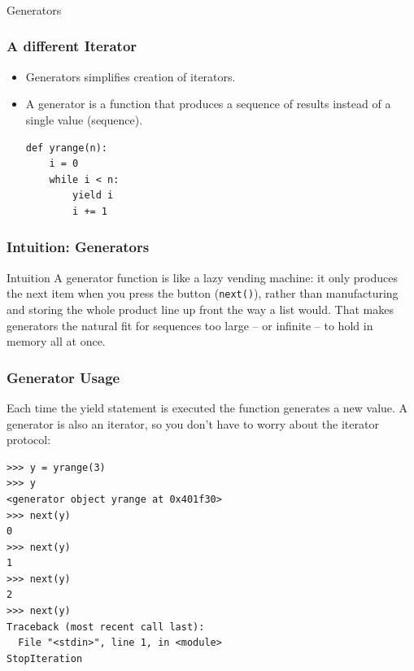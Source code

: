 \begin{frame}[fragile]\frametitle{}
\begin{center}
{\Large Generators}
\end{center}
\end{frame}


\begin{frame}[fragile]\frametitle{A different Iterator}

    \begin{itemize}
    \item  Generators simplifies creation of iterators. 
    \item A generator is a function that produces a sequence of results instead of a single value (sequence).
\begin{lstlisting}
def yrange(n):
    i = 0
    while i < n:
        yield i
        i += 1
\end{lstlisting}
    \end{itemize}
\end{frame}

\begin{frame}[fragile]\frametitle{Intuition: Generators}
\begin{block}{Intuition}
A generator function is like a lazy vending machine: it only produces the next item when you
press the button (\lstinline|next()|), rather than manufacturing and storing the whole product
line up front the way a list would. That makes generators the natural fit for sequences too
large -- or infinite -- to hold in memory all at once.
\end{block}
\end{frame}

\begin{frame}[fragile]\frametitle{Generator Usage}
Each time the yield statement is executed the function generates a new value. A generator is
also an iterator, so you don't have to worry about the iterator protocol:
\begin{lstlisting}
>>> y = yrange(3)
>>> y
<generator object yrange at 0x401f30>
>>> next(y)
0
>>> next(y)
1
>>> next(y)
2
>>> next(y)
Traceback (most recent call last):
  File "<stdin>", line 1, in <module>
StopIteration
\end{lstlisting}
\end{frame}

